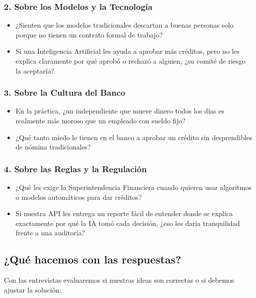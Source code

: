 \documentclass[11pt,a4paper]{article}
\begin{document}
\subsubsection{2. Sobre los Modelos y la Tecnología}
\begin{itemize}[leftmargin=*]
    \item ¿Sienten que los modelos tradicionales descartan a buenas personas solo porque no tienen un contrato formal de trabajo?
    \item Si una Inteligencia Artificial les ayuda a aprobar más créditos, pero no les explica claramente por qué aprobó o rechazó a alguien, ¿su comité de riesgo la aceptaría?
\end{itemize}

\subsubsection{3. Sobre la Cultura del Banco}
\begin{itemize}[leftmargin=*]
    \item En la práctica, ¿un independiente que mueve dinero todos los días es realmente más moroso que un empleado con sueldo fijo?
    \item ¿Qué tanto miedo le tienen en el banco a aprobar un crédito sin desprendibles de nómina tradicionales?
\end{itemize}

\subsubsection{4. Sobre las Reglas y la Regulación}
\begin{itemize}[leftmargin=*]
    \item ¿Qué les exige la Superintendencia Financiera cuando quieren usar algoritmos o modelos automáticos para dar créditos?
    \item Si nuestra API les entrega un reporte fácil de entender donde se explica exactamente por qué la IA tomó cada decisión, ¿eso les daría tranquilidad frente a una auditoría?
\end{itemize}

\subsection{¿Qué hacemos con las respuestas?}

Con las entrevistas evaluaremos si nuestras ideas son correctas o si debemos ajustar la solución:
\end{document}

